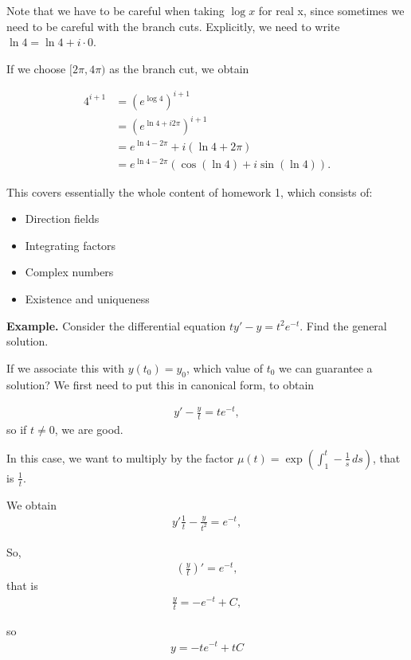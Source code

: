 \documentclass{article}
\begin{document}
Note that we have to be careful when taking $\log x$ for real x, since sometimes we need to be careful with the branch cuts.  Explicitly, we need to write $\ln 4 = \ln 4 + i \cdot 0$.

If we choose $[2\pi, 4\pi)$ as the branch cut, we obtain

\begin{align*}
  4^{i+1} &= (e^{\log 4})^{i+1} \\
  &= (e^{\ln 4 + i 2 \pi})^{i+1} \\
  &= e^{\ln 4 - 2 \pi} + i (\ln 4 + 2 \pi) \\
  &= e^{\ln 4 - 2 \pi} \left( \cos (\ln 4) + i \sin (\ln 4) \right).
\end{align*}

This covers essentially the whole content of homework 1, which consists of:

\begin{itemize}
  \item Direction fields
  \item Integrating factors
  \item Complex numbers
  \item Existence and uniqueness
\end{itemize}

{\bf Example.} Consider the differential equation $ty' - y = t^2 e^{-t}$.  Find the general solution.

If we associate this with $y(t_0) = y_0$, which value of $t_0$ we can guarantee a solution?  We first need to put this in canonical form, to obtain

\begin{align*}
  y' - \frac{y}{t} = t e^{-t},
\end{align*}
so if $t \neq 0$, we are good.

In this case, we want to multiply by the factor $\mu(t) = \exp \left( \int_{1}^{t} - \frac{1}{s} \, ds \right)$, that is $\frac{1}{t}$.

We obtain
\begin{align*}
  y' \frac{1}{t} - \frac{y}{t^2} = e^{-t},
\end{align*}

So,
\begin{align*}
  \left( \frac{y}{t} \right)' = e^{-t},
\end{align*}
that is
\begin{align*}
  \frac{y}{t} = - e^{-t} + C,
\end{align*}

so 
\begin{align*}
  y = - te^{-t} + tC
\end{align*}
\end{document}
